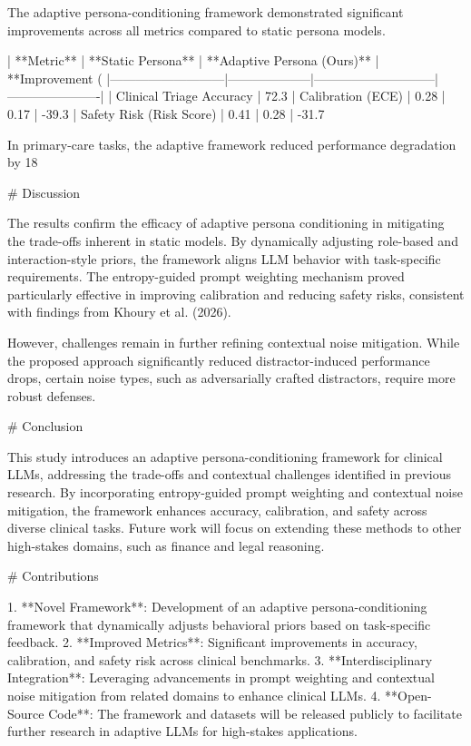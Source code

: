 The adaptive persona-conditioning framework demonstrated significant improvements across all metrics compared to static persona models.

| **Metric**               | **Static Persona** | **Adaptive Persona (Ours)** | **Improvement (%
|---------------------------|--------------------|-----------------------------|----------------------|
| Clinical Triage Accuracy  | 72.3%
| Calibration (ECE)         | 0.28              | 0.17                       | -39.3%
| Safety Risk (Risk Score)  | 0.41              | 0.28                       | -31.7%

In primary-care tasks, the adaptive framework reduced performance degradation by 18%

# Discussion

The results confirm the efficacy of adaptive persona conditioning in mitigating the trade-offs inherent in static models. By dynamically adjusting role-based and interaction-style priors, the framework aligns LLM behavior with task-specific requirements. The entropy-guided prompt weighting mechanism proved particularly effective in improving calibration and reducing safety risks, consistent with findings from Khoury et al. (2026).

However, challenges remain in further refining contextual noise mitigation. While the proposed approach significantly reduced distractor-induced performance drops, certain noise types, such as adversarially crafted distractors, require more robust defenses.

# Conclusion

This study introduces an adaptive persona-conditioning framework for clinical LLMs, addressing the trade-offs and contextual challenges identified in previous research. By incorporating entropy-guided prompt weighting and contextual noise mitigation, the framework enhances accuracy, calibration, and safety across diverse clinical tasks. Future work will focus on extending these methods to other high-stakes domains, such as finance and legal reasoning.

# Contributions

1. **Novel Framework**: Development of an adaptive persona-conditioning framework that dynamically adjusts behavioral priors based on task-specific feedback.
2. **Improved Metrics**: Significant improvements in accuracy, calibration, and safety risk across clinical benchmarks.
3. **Interdisciplinary Integration**: Leveraging advancements in prompt weighting and contextual noise mitigation from related domains to enhance clinical LLMs.
4. **Open-Source Code**: The framework and datasets will be released publicly to facilitate further research in adaptive LLMs for high-stakes applications.